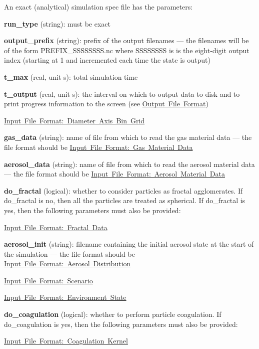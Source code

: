 An exact (analytical) simulation spec file has the parameters\+:
\begin{DoxyItemize}
\item {\bfseries run\+\_\+type} (string)\+: must be {\ttfamily exact} 
\item {\bfseries output\+\_\+prefix} (string)\+: prefix of the output filenames --- the filenames will be of the form {\ttfamily P\+R\+E\+F\+I\+X\+\_\+\+S\+S\+S\+S\+S\+S\+S\+S.\+nc} where {\ttfamily S\+S\+S\+S\+S\+S\+SS} is is the eight-\/digit output index (starting at 1 and incremented each time the state is output)
\item {\bfseries t\+\_\+max} (real, unit s)\+: total simulation time
\item {\bfseries t\+\_\+output} (real, unit s)\+: the interval on which to output data to disk and to print progress information to the screen (see \mbox{\hyperlink{output_format}{Output File Format}})
\item \mbox{\hyperlink{input_format_diam_bin_grid}{Input File Format\+: Diameter Axis Bin Grid}}
\item {\bfseries gas\+\_\+data} (string)\+: name of file from which to read the gas material data --- the file format should be \mbox{\hyperlink{input_format_gas_data}{Input File Format\+: Gas Material Data}}
\item {\bfseries aerosol\+\_\+data} (string)\+: name of file from which to read the aerosol material data --- the file format should be \mbox{\hyperlink{input_format_aero_data}{Input File Format\+: Aerosol Material Data}}
\item {\bfseries do\+\_\+fractal} (logical)\+: whether to consider particles as fractal agglomerates. If {\ttfamily do\+\_\+fractal} is {\ttfamily no}, then all the particles are treated as spherical. If {\ttfamily do\+\_\+fractal} is {\ttfamily yes}, then the following parameters must also be provided\+:
\begin{DoxyItemize}
\item \mbox{\hyperlink{input_format_fractal}{Input File Format\+: Fractal Data}}
\end{DoxyItemize}
\item {\bfseries aerosol\+\_\+init} (string)\+: filename containing the initial aerosol state at the start of the simulation --- the file format should be \mbox{\hyperlink{input_format_aero_dist}{Input File Format\+: Aerosol Distribution}}
\item \mbox{\hyperlink{input_format_scenario}{Input File Format\+: Scenario}}
\item \mbox{\hyperlink{input_format_env_state}{Input File Format\+: Environment State}}
\item {\bfseries do\+\_\+coagulation} (logical)\+: whether to perform particle coagulation. If {\ttfamily do\+\_\+coagulation} is {\ttfamily yes}, then the following parameters must also be provided\+:
\begin{DoxyItemize}
\item \mbox{\hyperlink{input_format_coag_kernel}{Input File Format\+: Coagulation Kernel}}
\end{DoxyItemize}
\end{DoxyItemize}


